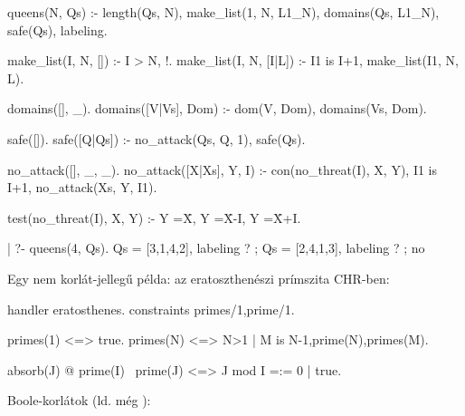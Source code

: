 \begin{prologcode}

queens(N, Qs) :-
        length(Qs, N), 
        make_list(1, N, L1_N), 
        domains(Qs, L1_N),       %
        safe(Qs),                %
        labeling.                %

make_list(I, N, []) :- I > N, !.
make_list(I, N, [I|L]) :-
        I1 is I+1,
        make_list(I1, N, L).

domains([], _).
domains([V|Vs], Dom) :- dom(V, Dom), domains(Vs, Dom).

safe([]).
safe([Q|Qs]) :- no_attack(Qs, Q, 1), safe(Qs).

no_attack([], _, _).
no_attack([X|Xs], Y, I) :-
        con(no_threat(I), X, Y),  %
        I1 is I+1, 
        no_attack(Xs, Y, I1).

test(no_threat(I), X, Y) :-
        Y =\= X, Y =\= X-I, Y =\= X+I.

| ?- queens(4, Qs).
                                Qs = [3,1,4,2], labeling ? ;
                                Qs = [2,4,1,3], labeling ? ; no
\end{prologcode}

Egy nem korlát-jellegű példa: az eratoszthenészi prímszita CHR-ben:

\begin{prologcode}
handler eratosthenes.
constraints primes/1,prime/1.

primes(1) <=> true.
primes(N) <=> N>1 | 
        M is N-1,prime(N),primes(M). 

absorb(J) @ prime(I) \ prime(J) <=> 
        J mod I =:= 0 | true.
\end{prologcode}

Boole-korlátok (ld. még ):

